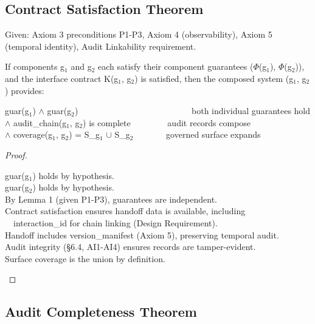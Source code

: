 \subsection{Contract Satisfaction Theorem}


\begin{cthm}
Given: Axiom 3 preconditions P1-P3, Axiom 4 (observability), Axiom 5 (temporal identity), Audit Linkability requirement.

If components g$_1$ and g$_2$ each satisfy their component guarantees ($\Phi$(g$_1$), $\Phi$(g$_2$)), and the interface contract K(g$_1$, g$_2$) is satisfied, then the composed system (g$_1$, g$_2$) provides:

\begin{cladnote}
guar(g$_1$) $\wedge$ guar(g$_2$)~~~~~~~~~~~~~~~~~~~~~~~~~~\textemdash{} both individual guarantees hold\\
$\wedge$ audit\_chain(g$_1$, g$_2$) is complete~~~~~~~~\textemdash{} audit records compose\\
$\wedge$ coverage(g$_1$, g$_2$) = S\_g$_1$ $\cup$ S\_g$_2$~~~~~~~\textemdash{} governed surface expands\\
\end{cladnote}
\end{cthm}

\begin{proof}
\begin{claddisp}
guar(g$_1$) holds by hypothesis.\\
guar(g$_2$) holds by hypothesis.\\
By Lemma 1 (given P1-P3), guarantees are independent.\\
Contract satisfaction ensures handoff data is available, including\\
~~interaction\_id for chain linking (Design Requirement).\\
Handoff includes version\_manifest (Axiom 5), preserving temporal audit.\\
Audit integrity (\S{}6.4, AI1-AI4) ensures records are tamper-evident.\\
Surface coverage is the union by definition.\\
\end{claddisp}
\end{proof}






\subsection{Audit Completeness Theorem}


